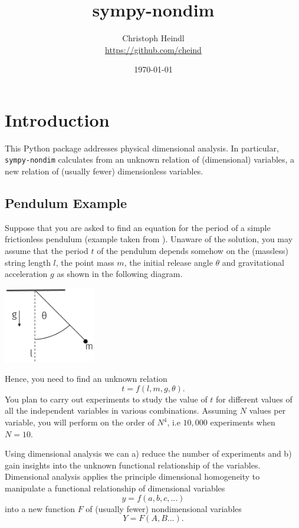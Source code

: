 \documentclass[11pt]{article}
\title{sympy-nondim}
\author{Christoph Heindl \\ \url{https://github.com/cheind} }
\date{\today}
\begin{document}
\maketitle

\section{Introduction}
This Python package addresses physical dimensional analysis. In particular, \texttt{sympy-nondim} calculates from an unknown relation of (dimensional) variables, a new relation of (usually fewer) dimensionless variables.

\subsection{Pendulum Example}
Suppose that you are asked to find an equation for the period of a simple frictionless pendulum (example taken from \cite{lemons2017student}). Unaware of the solution, you may assume that the period $t$ of the pendulum depends somehow on the (massless) string length $l$, the point mass $m$, the initial release angle $\theta$ and gravitational acceleration $g$ as shown in the following diagram.
\begin{center}
\includegraphics[width=0.3\textwidth]{pendulum.png}
\end{center}
Hence, you need to find an unknown relation $$t = f(l,m,g,\theta).$$ You plan to carry out experiments to study the value of $t$ for different values of all the independent variables in various combinations. Assuming $N$ values per variable, you will perform on the order of $N^4$, i.e $10,000$ experiments when $N=10$. 

Using dimensional analysis we can a) reduce the number of experiments and b) gain insights into the unknown functional relationship of the variables. Dimensional analysis applies the principle dimensional homogeneity to manipulate a functional relationship of dimensional variables $$y = f(a,b,c,...)$$ into a new function $F$ of (usually fewer) nondimensional variables $$Y = F(A,B...).$$
\end{document}
